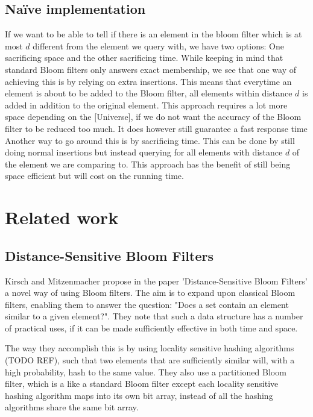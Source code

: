 \documentclass[a4paper,11pt]{article}
\begin{document}
\subsection{Naïve implementation}
If we want to be able to tell if there is an element in the bloom filter which is at most $d$ different from the element we query with, we have two options: One sacrificing space and the other sacrificing time. While keeping in mind that standard Bloom filters only answers exact membership, we see that one way of achieving this is by relying on extra insertions. This means that everytime an element is about to be added to the Bloom filter, all elements within distance $d$ is added in addition to the original element. This approach requires a lot more space depending on the [Universe], if we do not want the accuracy of the Bloom filter to be reduced too much. It does however still guarantee a fast response time\\
Another way to go around this is by sacrificing time. This can be done by still doing normal insertions but instead querying for all elements with distance $d$ of the element we are comparing to. This approach has the benefit of still being space efficient but will cost on the running time.







\section{Related work} %

\subsection{Distance-Sensitive Bloom Filters}
Kirsch and Mitzenmacher propose in the paper 'Distance-Sensitive Bloom Filters'\cite{paper:harvard} a novel way of using Bloom filters. The aim is to expand upon classical Bloom filters, enabling them to answer the question: "Does a set contain an element similar to a given element?". They note that such a data structure has a number of practical uses, if it can be made sufficiently effective in both time and space.

The way they accomplish this is by using locality sensitive hashing algorithms (TODO REF), such that two elements that are sufficiently similar will, with a high probability, hash to the same value. They also use a partitioned Bloom filter, which is a like a standard Bloom filter except each locality sensitive hashing algorithm maps into its own bit array, instead of all the hashing algorithms share the same bit array.
\end{document}
